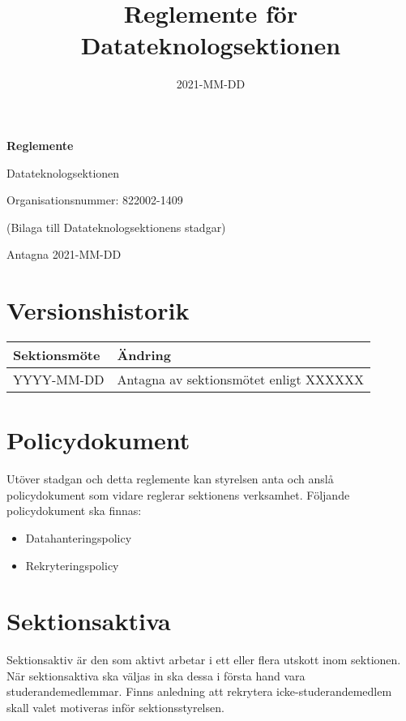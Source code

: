 \documentclass{datateknologsektionen-document}
\title{Reglemente för Datateknologsektionen}
\date{2021-MM-DD}
\begin{document}
\hspace{0pt}
\vfill

\begin{center}
  \Huge\textbf{Reglemente}

  \huge Datateknologsektionen

  \large
  Organisationsnummer: 822002-1409

  \vspace{4mm}
  (Bilaga till Datateknologsektionens stadgar)

  \vspace{4mm}

  Antagna 2021-MM-DD

\end{center}
\vfill
\hspace{0pt}
\pagebreak

\section*{Versionshistorik}
\begin{footnotesize}
  \begin{longtabu} to \linewidth { |l|X| }
    \hline
    \textbf{Sektionsmöte} & \textbf{Ändring}  \\ \hline
    YYYY-MM-DD & Antagna av sektionsmötet enligt XXXXXX \\ \hline
  \end{longtabu}
\end{footnotesize}

\pagebreak
\tableofcontents

\pagebreak

\section{Policydokument}
Utöver stadgan och detta reglemente kan styrelsen anta och anslå policydokument som
vidare reglerar sektionens verksamhet. Följande policydokument ska finnas:
\begin{itemize}
  \item Datahanteringspolicy
  \item Rekryteringspolicy
\end{itemize}

\section{Sektionsaktiva}
Sektionsaktiv är den som aktivt arbetar i ett eller flera utskott inom sektionen.
När sektionsaktiva ska väljas in ska dessa i första hand vara studerandemedlemmar.
Finns anledning att rekrytera icke-studerandemedlem skall valet motiveras inför
sektionsstyrelsen.
\end{document}
